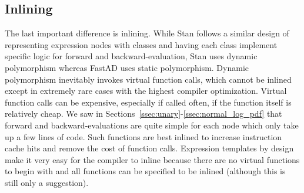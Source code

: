\subsection{Inlining}

The last important difference is inlining.
While Stan follows a similar design of representing
expression nodes with classes and having each class implement
specific logic for forward and backward-evaluation,
Stan uses dynamic polymorphism whereas FastAD uses static polymorphism.
Dynamic polymorphism inevitably invokes virtual function calls,
which cannot be inlined except in extremely rare cases
with the highest compiler optimization.
Virtual function calls can be expensive, especially if called often,
if the function itself is relatively cheap.
We saw in Sections~\ref{ssec:unary}-\ref{ssec:normal_log_pdf}
that forward and backward-evaluations are quite simple for each node
which only take up a few lines of code.
Such functions are best inlined to increase instruction cache hits
and remove the cost of function calls.
Expression templates by design make it very easy for the compiler to inline
because there are no virtual functions to begin with
and all functions can be specified to be inlined (although this is still only a suggestion).

